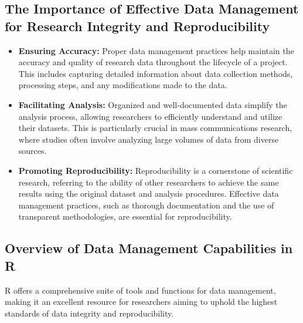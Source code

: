 \documentclass[
]{book}
\begin{document}
\hypertarget{the-importance-of-effective-data-management-for-research-integrity-and-reproducibility}{%
\subsection*{The Importance of Effective Data Management for Research Integrity and Reproducibility}\label{the-importance-of-effective-data-management-for-research-integrity-and-reproducibility}}

\begin{itemize}
\item
  \textbf{Ensuring Accuracy:} Proper data management practices help maintain the accuracy and quality of research data throughout the lifecycle of a project. This includes capturing detailed information about data collection methods, processing steps, and any modifications made to the data.
\item
  \textbf{Facilitating Analysis:} Organized and well-documented data simplify the analysis process, allowing researchers to efficiently understand and utilize their datasets. This is particularly crucial in mass communications research, where studies often involve analyzing large volumes of data from diverse sources.
\item
  \textbf{Promoting Reproducibility:} Reproducibility is a cornerstone of scientific research, referring to the ability of other researchers to achieve the same results using the original dataset and analysis procedures. Effective data management practices, such as thorough documentation and the use of transparent methodologies, are essential for reproducibility.
\end{itemize}

\hypertarget{overview-of-data-management-capabilities-in-r}{%
\subsection*{Overview of Data Management Capabilities in R}\label{overview-of-data-management-capabilities-in-r}}

R offers a comprehensive suite of tools and functions for data management, making it an excellent resource for researchers aiming to uphold the highest standards of data integrity and reproducibility.
\end{document}
